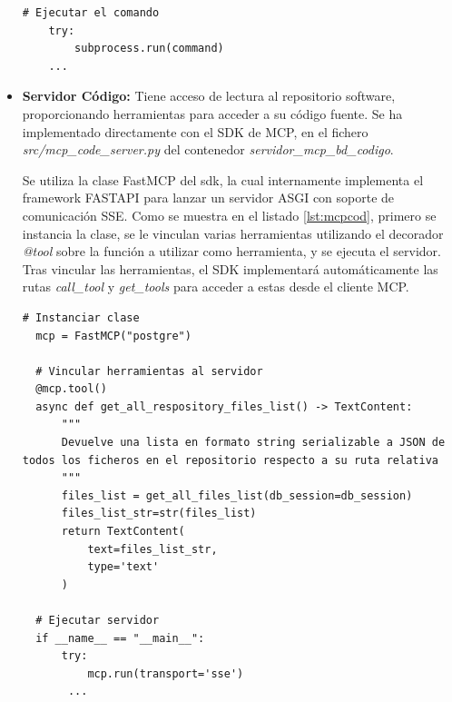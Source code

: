 \begin{itemize}
\begin{lstlisting}[caption={Ejecución del lanzamiento de servidor MCP Confluence con uvx},label={lst:check_data}]
    # Ejecutar el comando
    try:
        subprocess.run(command)
    ...
\end{lstlisting}

\item\textbf{Servidor Código: }Tiene acceso de lectura al repositorio software, proporcionando herramientas para acceder a su código fuente. Se ha implementado directamente con el SDK de MCP, en el fichero \textit{src/mcp\_code\_server.py} del contenedor \textit{servidor\_mcp\_bd\_codigo}. 

  Se utiliza la clase FastMCP del sdk, la cual internamente implementa el framework FASTAPI para lanzar un servidor ASGI con soporte de comunicación SSE. Como se muestra en el listado \ref{lst:mcpcod}, primero se instancia la clase, se le vinculan varias herramientas utilizando el decorador \textit{@tool} sobre la función a utilizar como herramienta, y se ejecuta el servidor. Tras vincular las herramientas, el SDK implementará automáticamente las rutas \textit{call\_tool} y \textit{get\_tools} para acceder a estas desde el cliente MCP.

\begin{lstlisting}[caption={Implementación de servidor MCP con SDK de python},label={lst:mcpcod}]
  # Instanciar clase 
  mcp = FastMCP("postgre")

  # Vincular herramientas al servidor
  @mcp.tool()
  async def get_all_respository_files_list() -> TextContent:
      """
      Devuelve una lista en formato string serializable a JSON de todos los ficheros en el repositorio respecto a su ruta relativa
      """
      files_list = get_all_files_list(db_session=db_session)
      files_list_str=str(files_list)
      return TextContent(
          text=files_list_str,
          type='text'
      )

  # Ejecutar servidor
  if __name__ == "__main__":
      try:
          mcp.run(transport='sse')
       ...

\end{lstlisting}


\end{itemize}


